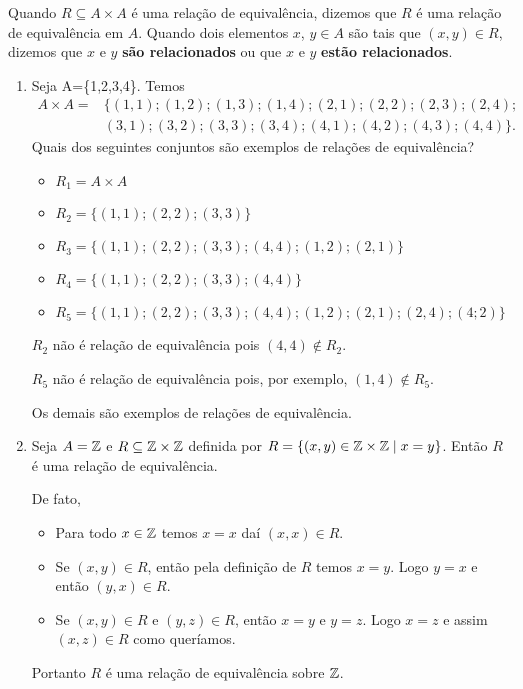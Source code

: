 Quando $R\subseteq A \times A$ {\'e} uma rela{\c c}{\~a}o de equival{\^e}ncia, dizemos que $R$ {\'e} uma rela{\c c}{\~a}o de equival{\^e}ncia em $A$. Quando dois elementos $x$, $y \in A$ s{\~a}o tais que $(x,y) \in R$, dizemos que $x$ e $y$ \textbf{s{\~a}o relacionados} ou que $x$ e $y$ \textbf{estão relacionados}.

\begin{exemplos}\label{exemplos_relacoes_equivalencia}
	\begin{enumerate}
		\item Seja A=\{1,2,3,4\}. Temos
		\begin{align*}
			A\times A = &\{(1,1);(1,2);(1,3);(1,4);(2,1);(2,2);(2,3);(2,4);\\ &(3,1);(3,2);(3,3);(3,4);(4,1);(4,2);(4,3);(4,4)\}.
		\end{align*}
		Quais dos seguintes conjuntos são exemplos de rela{\c c}{\~o}es de equival{\^e}ncia?
		\begin{itemize}
			\item $R_{1}= A\times A$
			\item $R_{2}=\{(1,1);(2,2);(3,3)\}$
			\item $R_{3}=\{(1,1);(2,2);(3,3);(4,4);(1,2);(2,1)\}$
			\item $R_{4}=\{(1,1);(2,2);(3,3);(4,4)\}$
			\item $R_{5}=\{(1,1);(2,2);(3,3);(4,4);(1,2);(2,1);(2,4);(4;2)\}$
		\end{itemize}
		\begin{solucao}
			$R_2$ não é relação de equivalência pois $(4,4) \notin R_2$.

			$R_5$ não é relação de equivalência pois, por exemplo, $(1,4) \notin R_5$.

			Os demais são exemplos de relações de equivalência.
		\end{solucao}
		
		\item Seja $A = \mathbb{Z}$ e $R\subseteq \mathbb{Z}\times \mathbb{Z}$ definida por $R = \{(x,y)\in \mathbb{Z} \times \mathbb{Z} \mid x = y\}$.
		Então $R$ {\'e} uma rela{\c c}{\~a}o de equival{\^e}ncia.
		\begin{solucao}
			De fato,
			\begin{itemize}
				\item Para todo $x \in \mathbb{Z}$ temos $x = x$ daí $(x,x) \in R$.
				\item Se $(x,y)\in R$, então pela definição de $R$ temos $x = y$. Logo $y = x$ e então $(y,x)\in R$.
				\item Se $(x,y) \in R$ e $(y,z) \in R$, então  $x = y$ e $y = z$. Logo $x = z$ e assim $(x,z)\in R$ como queríamos.
			\end{itemize}
			Portanto $R$ é uma relação de equivalência sobre $\mathbb{Z}$.
		\end{solucao}
		

\end{enumerate}
\end{exemplos}

